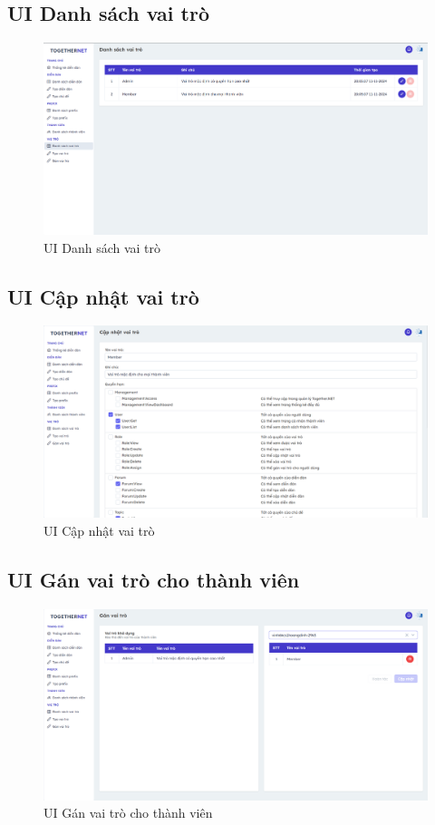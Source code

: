 \documentclass[../index.tex]{subfiles}
\begin{document}
    \subsection{UI Danh sách vai trò}
    \begin{figure}[H]
        \centering
        \includegraphics[width=1\linewidth]{figures/demo/management-role-page.png}
        \caption{UI Danh sách vai trò}
    \end{figure}

    \subsection{UI Cập nhật vai trò}
    \begin{figure}[H]
        \centering
        \includegraphics[width=1\linewidth]{figures/demo/management-role-update-page.png}
        \caption{UI Cập nhật vai trò}
    \end{figure}

    \subsection{UI Gán vai trò cho thành viên}
    \begin{figure}[H]
        \centering
        \includegraphics[width=1\linewidth]{figures/demo/management-role-assign.png}
        \caption{UI Gán vai trò cho thành viên}
    \end{figure}
    
\end{document}
